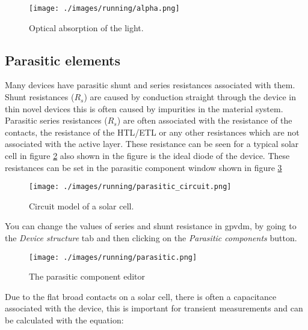 \begin{figure}[h!]
\centering
\texttt{[image: ./images/running/alpha.png]}
\caption{Optical absorption of the light.}
\label{fig:alpha}
\end{figure}

\vspace*{\fill}

\newpage
\subsection{Parasitic elements}
\label{sec:parasitic}

Many devices have parasitic shunt and series resistances associated with them.  Shunt resistances ($R_{s}$) are caused by conduction straight through the device in thin novel devices this is often caused by impurities in the material system.  Parasitic series resistances ($R_{s}$) are often associated with the resistance of the contacts, the resistance of the HTL/ETL or any other resistances which are not associated with the active layer.  These resistance can be seen for a typical solar cell in figure \ref{fig:parasitic_circuit} also shown in the figure is the ideal diode of the device. These resistances can be set in the parasitic component window shown in figure \ref{fig:parasitic}


\begin{figure}[h!]
\centering
\texttt{[image: ./images/running/parasitic\_circuit.png]}
\caption{Circuit model of a solar cell.}
\label{fig:parasitic_circuit}
\end{figure}


You can change the values of series and shunt resistance in gpvdm, by going to the \emph{Device structure} tab and then clicking on the \emph{Parasitic components} button.

\begin{figure}[H]
\centering
\texttt{[image: ./images/running/parasitic.png]}
\caption{The parasitic component editor}
\label{fig:parasitic}
\end{figure}

Due to the flat broad contacts on a solar cell, there is often a capacitance associated with the device, this is important for transient measurements and can be calculated with the equation:

